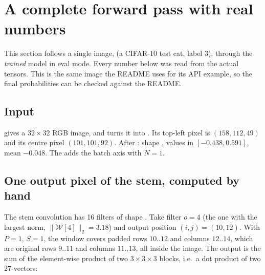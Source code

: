 \section{A complete forward pass with real numbers}
\label{sec:forward}

This section follows a single image,  (a CIFAR-10 test cat, label 3), through the \emph{trained} model  in eval mode. Every number below was read from the actual tensors. This is the same image the README uses for its API example, so the final probabilities can be checked against the README.

\subsection{Input}

\begin{repo}
 gives a $32\times32$ RGB image, and  turns it into  . Its top-left pixel is $(158,112,49)$ and its centre pixel $(101,101,92)$. After : shape , values in $[-0.438,0.591]$, mean $-0.048$. The  adds the batch axis with $N=1$.
\end{repo}

\subsection{One output pixel of the stem, computed by hand}

The stem convolution has 16 filters of shape . Take filter $o=4$ (the one with the largest norm, $\|\mathcal W[4]\|_2 = 3.18$) and output position $(i,j)=(10,12)$. With $P=1$, $S=1$, the window covers padded rows $10..12$ and columns $12..14$, which are original rows $9..11$ and columns $11..13$, all inside the image. The output is the sum of the element-wise product of two $3\times3\times3$ blocks, i.e.\ a dot product of two 27-vectors:


